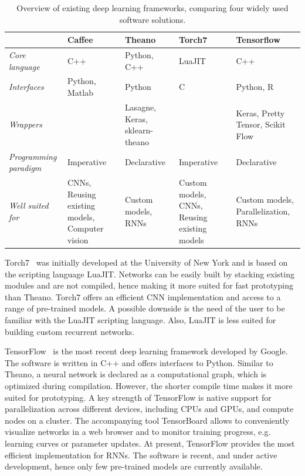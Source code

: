 \begin{table}
\centering
\begin{tabular}{p{2.5cm}|p{2.6cm}|p{2.6cm}|p{2.6cm}|p{2.6cm}}
\toprule
& \textbf{Caffee} & \textbf{Theano} & \textbf{Torch7} & \textbf{Tensorflow} \\
\hline
\textit{Core language} & C++ & Python, C++ & LuaJIT  & C++\\
\hline
\textit{Interfaces} & Python, Matlab & Python & C & Python, R \\
\hline
\textit{Wrappers} & & Lasagne, Keras, sklearn-theano & & Keras, Pretty Tensor, Scikit Flow \\
\hline
\textit{Programming paradigm} & Imperative & Declarative & Imperative & Declarative \\
\hline
\textit{Well suited for} & CNNs, Reusing existing models, Computer vision & Custom models, RNNs & Custom models, CNNs, Reusing existing models & Custom models, Parallelization, RNNs \\
\bottomrule
\end{tabular}
\caption{Overview of existing deep learning frameworks, comparing four widely used software solutions.}
\label{tab:dl_tools}
\end{table}

Torch7~\citep{collobert_torch7:_2011} was initially developed at the University of New York and is based on the scripting language LuaJIT. Networks can be easily built by stacking existing modules and are not compiled, hence making it more suited for fast prototyping than Theano. Torch7 offers an efficient CNN implementation and access to a range of pre-trained models. A possible downside is the need of the user to be familiar with the LuaJIT scripting language. Also, LuaJIT is less suited for building custom recurrent networks.

TensorFlow~\citep{abadi_tensorflow:_2016} is the most recent deep learning framework developed by Google. The software is written in C++ and offers interfaces to Python. Similar to Theano, a neural network is declared as a computational graph, which is optimized during compilation. However, the shorter compile time makes it more suited for prototyping. A key strength of TensorFlow is native support for parallelization across different devices, including CPUs and GPUs, and compute nodes on a cluster. The accompanying tool TensorBoard allows to conveniently visualize networks in a web browser and to monitor training progress, e.g. learning curves or parameter updates. At present, TensorFlow provides the most efficient implementation for RNNs. The software is recent, and under active development, hence only few pre-trained models are currently available.


